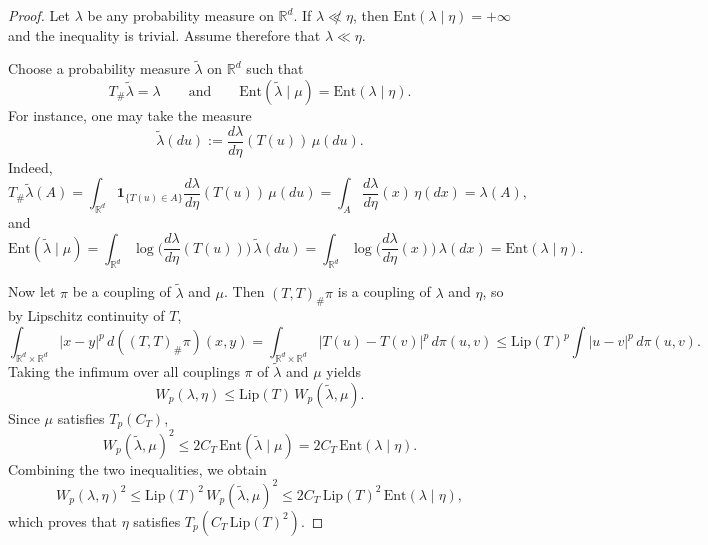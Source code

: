 \documentclass{tsp-short}
\theoremstyle{remark}
\theoremstyle{definition}
\newcommand{\Ent}{\mathrm{Ent}}
\begin{document}
\begin{proof}
Let $\lambda$ be any probability measure on $\mathbb{R}^d$.
If $\lambda\not\ll \eta$, then $\Ent(\lambda\mid\eta)=+\infty$ and the inequality is trivial.
Assume therefore that $\lambda\ll \eta$.

Choose a probability measure $\widetilde\lambda$ on $\mathbb{R}^d$ such that
\begin{equation*}
T_{\#}\widetilde\lambda=\lambda
\qquad\text{and}\qquad
\Ent(\widetilde\lambda\mid \mu)=\Ent(\lambda\mid \eta).
\end{equation*}
For instance, one may take the measure
\begin{equation*}
\widetilde\lambda(du):=
\frac{d\lambda}{d\eta}(T(u))\,\mu(du).
\end{equation*}
Indeed,
\begin{equation*}
T_{\#}\widetilde\lambda(A)
=
\int_{\mathbb{R}^d}\mathbf 1_{\{T(u)\in A\}}\frac{d\lambda}{d\eta}(T(u))\,\mu(du)
=
\int_A \frac{d\lambda}{d\eta}(x)\,\eta(dx)
=
\lambda(A),
\end{equation*}
and
\begin{equation*}
\Ent(\widetilde\lambda\mid\mu)
=
\int_{\mathbb{R}^d}\log\Big(\frac{d\lambda}{d\eta}(T(u))\Big)\,\widetilde\lambda(du)
=
\int_{\mathbb{R}^d}\log\Big(\frac{d\lambda}{d\eta}(x)\Big)\,\lambda(dx)
=
\Ent(\lambda\mid\eta).
\end{equation*}

Now let $\pi$ be a coupling of $\widetilde\lambda$ and $\mu$.
Then $(T,T)_{\#}\pi$ is a coupling of $\lambda$ and $\eta$, so by Lipschitz continuity of $T$,
\begin{equation*}
\int_{\mathbb{R}^d\times\mathbb{R}^d}|x-y|^p\,d((T,T)_{\#}\pi)(x,y)
=
\int_{\mathbb{R}^d\times\mathbb{R}^d}|T(u)-T(v)|^p\,d\pi(u,v)
\le
\mathrm{Lip}(T)^p
\int |u-v|^p\,d\pi(u,v).
\end{equation*}
Taking the infimum over all couplings $\pi$ of $\widetilde\lambda$ and $\mu$ yields
\begin{equation*}
W_p(\lambda,\eta)\le \mathrm{Lip}(T)\,W_p(\widetilde\lambda,\mu).
\end{equation*}
Since $\mu$ satisfies $T_p(C_T)$,
\begin{equation*}
W_p(\widetilde\lambda,\mu)^2
\le
2C_T\,\Ent(\widetilde\lambda\mid\mu)
=
2C_T\,\Ent(\lambda\mid\eta).
\end{equation*}
Combining the two inequalities, we obtain
\begin{equation*}
W_p(\lambda,\eta)^2
\le
\mathrm{Lip}(T)^2\,W_p(\widetilde\lambda,\mu)^2
\le
2C_T\,\mathrm{Lip}(T)^2\,\Ent(\lambda\mid\eta),
\end{equation*}
which proves that $\eta$ satisfies $T_p(C_T\,\mathrm{Lip}(T)^2)$.
\end{proof}
\end{document}
